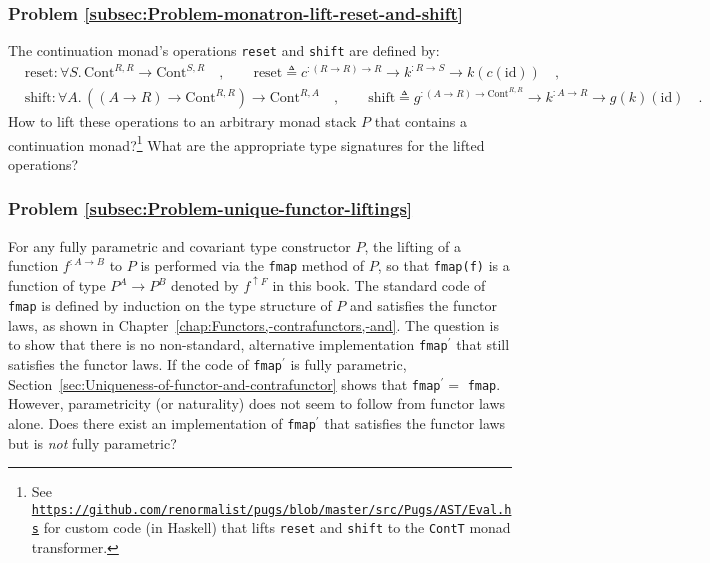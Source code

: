 \subsubsection{Problem \label{subsec:Problem-monatron-lift-reset-and-shift}\ref{subsec:Problem-monatron-lift-reset-and-shift}}

The continuation monad\textsf{'}s operations \lstinline!reset! and \lstinline!shift!
are defined by:
\begin{align*}
 & \text{reset}:\forall S.\,\text{Cont}^{R,R}\rightarrow\text{Cont}^{S,R}\quad,\quad\quad\text{reset}\triangleq c^{:\left(R\rightarrow R\right)\rightarrow R}\rightarrow k^{:R\rightarrow S}\rightarrow k(c(\text{id}))\quad,\\
 & \text{shift}:\forall A.\,((A\rightarrow R)\rightarrow\text{Cont}^{R,R})\rightarrow\text{Cont}^{R,A}\quad,\quad\quad\text{shift}\triangleq g^{:\left(A\rightarrow R\right)\rightarrow\text{Cont}^{R,R}}\rightarrow k^{:A\rightarrow R}\rightarrow g(k)(\text{id})\quad.
\end{align*}
How to lift these operations to an arbitrary monad stack $P$ that
contains a continuation monad?\footnote{See \texttt{\href{https://github.com/renormalist/pugs/blob/master/src/Pugs/AST/Eval.hs}{https://github.com/renormalist/pugs/blob/master/src/Pugs/AST/Eval.hs}}
for custom code (in Haskell) that lifts \lstinline!reset! and \lstinline!shift!
to the \lstinline!ContT! monad transformer.} What are the appropriate type signatures for the lifted operations?

\subsubsection{Problem \label{subsec:Problem-unique-functor-liftings}\ref{subsec:Problem-unique-functor-liftings}}

For any fully parametric and covariant type constructor $P$, the
lifting of a function $f^{:A\rightarrow B}$ to $P$ is performed
via the \lstinline!fmap! method of $P$, so that \lstinline!fmap(f)!
is a function of type $P^{A}\rightarrow P^{B}$ denoted by $f^{\uparrow F}$
in this book. The standard code of \lstinline!fmap! is defined by
induction on the type structure of $P$ and satisfies the functor
laws, as shown in Chapter~\ref{chap:Functors,-contrafunctors,-and}.
The question is to show that there is no non-standard, alternative
implementation \lstinline!fmap!$^{\prime}$ that still satisfies
the functor laws. If the code of \lstinline!fmap!$^{\prime}$ is
fully parametric, Section~\ref{sec:Uniqueness-of-functor-and-contrafunctor}
shows that \lstinline!fmap!$^{\prime}=$ \lstinline!fmap!. However,
parametricity (or naturality) does not seem to follow from functor
laws alone. Does there exist an implementation of \lstinline!fmap!$^{\prime}$
that satisfies the functor laws but is \emph{not} fully parametric?

